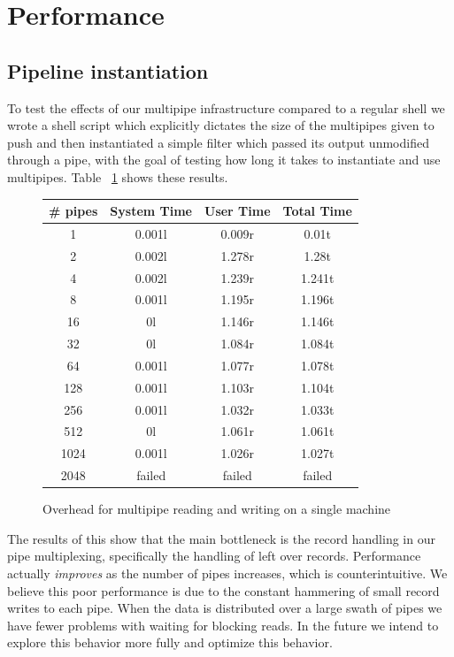 \documentclass[11pt, letterpaper]{article}
\begin{document}
\section{Performance}

\subsection{Pipeline instantiation}

To test the effects of our multipipe infrastructure compared to a regular shell we wrote a shell script which explicitly dictates the size of the multipipes given to push and then instantiated a simple filter which passed its output unmodified through a pipe, with the goal of testing how long it takes to instantiate and use multipipes. Table ~\ref{fig:mpipeohead} shows these results.
\begin{figure}[htp]
\centering
\begin{center}

  \begin{tabular}{ | c | c | c || c |}
 \hline
 \# pipes & System Time & User Time & Total Time \\
 \hline
 1 & 0.001l & 0.009r & 0.01t \\
 2 & 0.002l & 1.278r & 1.28t \\ 
 4 & 0.002l & 1.239r & 1.241t \\
 8 & 0.001l & 1.195r & 1.196t \\
 16 & 0l & 1.146r & 1.146t \\
32 & 0l & 1.084r & 1.084t \\
64 & 0.001l & 1.077r & 1.078t \\
128 & 0.001l & 1.103r & 1.104t \\
 256 & 0.001l & 1.032r & 1.033t \\
 512 & 0l & 1.061r & 1.061t \\
 1024 & 0.001l & 1.026r & 1.027t \\
 2048 & failed & failed & failed \\
 \hline
 \end{tabular}
\end{center}
\caption{Overhead for multipipe reading and writing on a single machine}\label{fig:mpipeohead}
\end{figure}

The results of this show that the main bottleneck is the record handling in our pipe multiplexing, specifically the handling of left over records. Performance actually \emph{improves} as the number of pipes increases, which is counterintuitive. We believe this poor performance is due to the constant hammering of small record writes to each pipe. When the data is distributed over a large swath of pipes we have fewer problems with waiting for blocking reads. In the future we intend to explore this behavior more fully and optimize this behavior.
\end{document}
